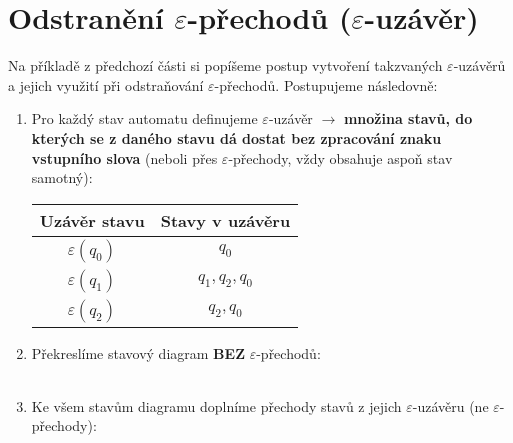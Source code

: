 \documentclass{report}
\begin{document}
\section{Odstranění $\varepsilon$-přechodů ($\varepsilon$-uzávěr)}
Na příkladě z předchozí části si popíšeme postup vytvoření takzvaných $\varepsilon$-uzávěrů a jejich využití při odstraňování $\varepsilon$-přechodů. Postupujeme následovně:\\
\begin{enumerate}
    \item Pro každý stav automatu definujeme $\varepsilon$-uzávěr $\rightarrow$ \textbf{množina stavů, do kterých se z daného stavu dá dostat bez zpracování znaku vstupního slova} (neboli přes $\varepsilon$-přechody, vždy obsahuje aspoň stav samotný):\\
    \begin{center}
    \begin{tabular}{c|c}
        \textbf{Uzávěr stavu} & \textbf{Stavy v uzávěru} \\ \hline 
         $\varepsilon(q_0)$ & $q_0$  \\
         $\varepsilon(q_1)$ & $q_1, q_2, q_0$ \\
         $\varepsilon(q_2)$ & $q_2, q_0$ \\
    \end{tabular}
    \end{center}
    \item Překreslíme stavový diagram \textbf{BEZ} $\varepsilon$-přechodů:\\ \\
    \begin{center}
    \end{center}
    \item Ke všem stavům diagramu doplníme přechody stavů z jejich $\varepsilon$-uzávěru (ne $\varepsilon$-přechody): \\ \\
    \begin{center}
\end{center}
\end{enumerate}
\end{document}
